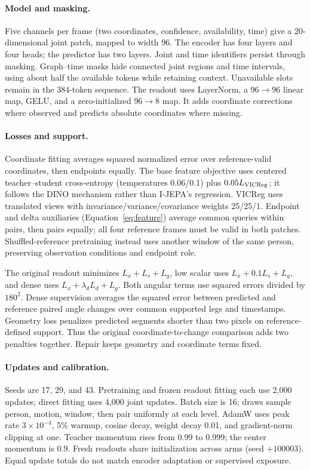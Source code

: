 \paragraph{Model and masking.} Five channels per frame (two coordinates, confidence, availability, time) give a 20-dimensional joint patch, mapped to width 96. The encoder has four layers and four heads; the predictor has two layers. Joint and time identifiers persist through masking. Graph--time masks hide connected joint regions and time intervals, using about half the available tokens while retaining context. Unavailable slots remain in the 384-token sequence. The readout uses LayerNorm, a $96\to96$ linear map, GELU, and a zero-initialized $96\to8$ map. It adds coordinate corrections where observed and predicts absolute coordinates where missing.

\paragraph{Losses and support.} Coordinate fitting averages squared normalized error over reference-valid coordinates, then endpoints equally. The base feature objective uses centered teacher--student cross-entropy (temperatures 0.06/0.1) plus $0.05L_{\rm VICReg}$; it follows the DINO mechanism rather than I-JEPA's regression. VICReg uses translated views with invariance/variance/covariance weights 25/25/1. Endpoint and delta auxiliaries (Equation~\ref{eq:feature}) average common queries within pairs, then pairs equally; all four reference frames must be valid in both patches. Shuffled-reference pretraining instead uses another window of the same person, preserving observation conditions and endpoint role.

The original readout minimizes $L_x+L_s+L_g$, low scalar uses $L_x+0.1L_s+L_g$, and dense uses $L_x+\lambda_dL_d+L_g$. Both angular terms use squared errors divided by $180^2$. Dense supervision averages the squared error between predicted and reference paired angle changes over common supported legs and timestamps. Geometry loss penalizes predicted segments shorter than two pixels on reference-defined support. Thus the original coordinate-to-change comparison adds two penalties together. Repair keeps geometry and coordinate terms fixed.

\paragraph{Updates and calibration.} Seeds are 17, 29, and 43. Pretraining and frozen readout fitting each use 2,000 updates; direct fitting uses 4,000 joint updates. Batch size is 16; draws sample person, motion, window, then pair uniformly at each level. AdamW uses peak rate $3\times10^{-4}$, 5\% warmup, cosine decay, weight decay 0.01, and gradient-norm clipping at one. Teacher momentum rises from 0.99 to 0.999; the center momentum is 0.9. Fresh readouts share initialization across arms (seed $+100003$). Equal update totals do not match encoder adaptation or supervised exposure.

